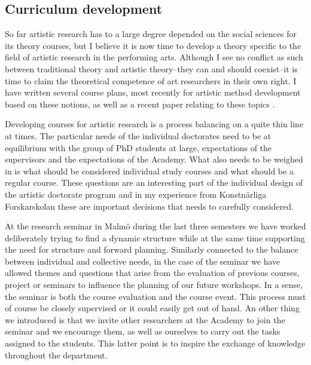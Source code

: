 \documentclass[a4paper]{article}
\begin{document}
\subsection*{\textsf{Curriculum development}}
\label{sec:curr-devel}


So far artistic research has to a large degree depended on the social sciences for its theory courses, but I believe it is now time to develop a theory specific to the field of artistic research in the performing arts. Although I see no conflict as such between traditional theory and artistic theory--they can and should coexist--it is time to claim the theoretical competence of art researchers in their own right. I have written several course plans, most recently for artistic method development based on these notions, as well as a recent paper relating to these topics \citep{frisk-ost13}.

Developing courses for artistic research is a process balancing on a quite thin line at times. The particular needs of the individual doctorates need to be at equilibrium with the group of PhD students at large, expectations of the supervisors and the expectations of the Academy. What also needs to be weighed in is what should be considered individual study courses and what should be a regular course. These questions are an interesting part of the individual design of the artistic doctorate program and in my experience from Konstnärliga Forskarskolan these are important decisions that needs to carefully considered.

At the research seminar in Malmö during the last three semesters we have worked deliberately trying to find a dynamic structure while at the same time supporting the need for structure and forward planning. Similarly connected to the balance between individual and collective needs, in the case of the seminar we have allowed themes and questions that arise from the evaluation of previous courses, project or seminars to influence the planning of our future workshops. In a sense, the seminar is both the course evaluation and the course event. This process must of course be closely supervised or it could easily get out of hand. An other thing we introduced is that we invite other researchers at the Academy to join the seminar and we encourage them, as well as ourselves to carry out the tasks assigned to the students. This latter point is to inspire the exchange of knowledge throughout the department.
\end{document}

